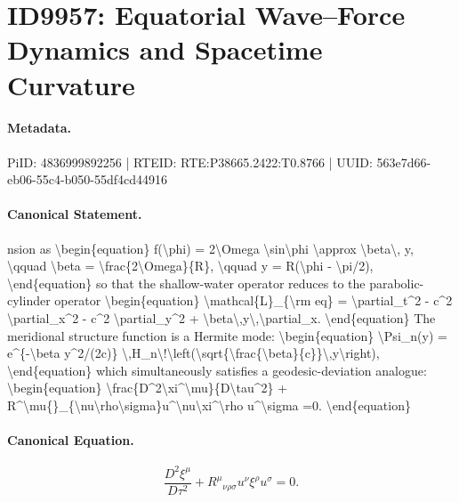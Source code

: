 \section*{ID9957: Equatorial Wave–Force Dynamics and Spacetime Curvature}
\paragraph{Metadata.}
PiID: 4836999892256 | RTEID: RTE:P38665.2422:T0.8766 | UUID: 563e7d66-eb06-55c4-b050-55df4cd44916

\paragraph{Canonical Statement.}
nsion as \textbackslash{}begin\{equation\} f(\textbackslash{}phi) = 2\textbackslash{}Omega \textbackslash{}sin\textbackslash{}phi \textbackslash{}approx \textbackslash{}beta\textbackslash{}, y, \textbackslash{}qquad \textbackslash{}beta = \textbackslash{}frac\{2\textbackslash{}Omega\}\{R\}, \textbackslash{}qquad y = R(\textbackslash{}phi - \textbackslash{}pi/2), \textbackslash{}end\{equation\} so that the shallow-water operator reduces to the parabolic-cylinder operator \textbackslash{}begin\{equation\} \textbackslash{}mathcal\{L\}\_\{\textbackslash{}rm eq\} = \textbackslash{}partial\_t\textasciicircum{}2 - c\textasciicircum{}2 \textbackslash{}partial\_x\textasciicircum{}2 - c\textasciicircum{}2 \textbackslash{}partial\_y\textasciicircum{}2 + \textbackslash{}beta\textbackslash{},y\textbackslash{},\textbackslash{}partial\_x. \textbackslash{}end\{equation\} The meridional structure function is a Hermite mode: \textbackslash{}begin\{equation\} \textbackslash{}Psi\_n(y) = e\textasciicircum{}\{-\textbackslash{}beta y\textasciicircum{}2/(2c)\} \textbackslash{},H\_n\textbackslash{}!\textbackslash{}left(\textbackslash{}sqrt\{\textbackslash{}frac\{\textbackslash{}beta\}\{c\}\}\textbackslash{},y\textbackslash{}right), \textbackslash{}end\{equation\} which simultaneously satisfies a geodesic-deviation analogue: \textbackslash{}begin\{equation\} \textbackslash{}frac\{D\textasciicircum{}2\textbackslash{}xi\textasciicircum{}\textbackslash{}mu\}\{D\textbackslash{}tau\textasciicircum{}2\} + R\textasciicircum{}\textbackslash{}mu\{\}\_\{\textbackslash{}nu\textbackslash{}rho\textbackslash{}sigma\}u\textasciicircum{}\textbackslash{}nu\textbackslash{}xi\textasciicircum{}\textbackslash{}rho u\textasciicircum{}\textbackslash{}sigma =0. \textbackslash{}end\{equation\}

\paragraph{Canonical Equation.}
\[
\frac{D^2\xi^\mu}{D\tau^2} + R^\mu{}_{\nu\rho\sigma}u^\nu\xi^\rho u^\sigma =0.
\]

